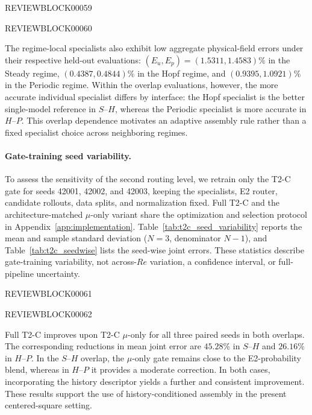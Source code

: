 \documentclass{article}
\begin{document}
\par


REVIEWBLOCK00059


\par

\par


REVIEWBLOCK00060


\par

The regime-local specialists also exhibit low aggregate physical-field errors under their respective held-out evaluations: $(E_u,E_p)=(1.5311,1.4583)\%$ in the Steady regime, $(0.4387,0.4844)\%$ in the Hopf regime, and $(0.9395,1.0921)\%$ in the Periodic regime. Within the overlap evaluations, however, the more accurate individual specialist differs by interface: the Hopf specialist is the better single-model reference in $S$--$H$, whereas the Periodic specialist is more accurate in $H$--$P$. This overlap dependence motivates an adaptive assembly rule rather than a fixed specialist choice across neighboring regimes.





\paragraph{Gate-training seed variability.}
To assess the sensitivity of the second routing level, we retrain only the
T2-C gate for seeds 42001, 42002, and 42003, keeping the specialists, E2
router, candidate rollouts, data splits, and normalization fixed. Full T2-C
and the architecture-matched $\mu$-only variant share the optimization and
selection protocol in Appendix~\ref{app:implementation}.
Table~\ref{tab:t2c_seed_variability} reports the mean and sample standard
deviation ($N=3$, denominator $N-1$), and Table~\ref{tab:t2c_seedwise}
lists the seed-wise joint errors. These statistics describe gate-training
variability, not across-$Re$ variation, a confidence interval, or
full-pipeline uncertainty.

\par


REVIEWBLOCK00061


\par

\par


REVIEWBLOCK00062


\par

Full T2-C improves upon T2-C $\mu$-only for all three paired seeds in both overlaps. The corresponding reductions in mean joint error are $45.28\%$ in $S$--$H$ and $26.16\%$ in $H$--$P$. In the $S$--$H$ overlap, the $\mu$-only gate remains close to the E2-probability blend, whereas in $H$--$P$ it provides a moderate correction.
In both cases, incorporating the history descriptor yields a further and consistent improvement. These results support the use of history-conditioned assembly in the present centered-square setting.
\end{document}
